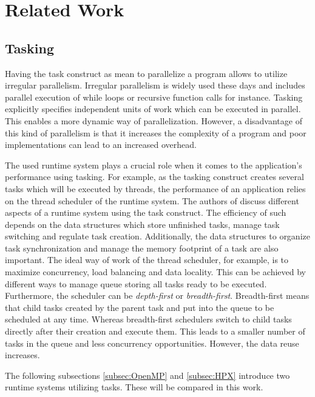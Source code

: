 \section{Related Work}

\subsection{Tasking}
  Having the task construct as mean to parallelize a program allows to utilize irregular parallelism.
  Irregular parallelism is widely used these days and includes parallel execution of while loops or recursive function calls for instance.
  Tasking explicitly specifies independent units of work which can be executed in parallel.
  This enables a more dynamic way of parallelization.
  However, a disadvantage of this kind of parallelism is that it increases the complexity of a program and poor implementations can lead to an increased overhead.~\cite{Ayguade.2009}~\cite{LaGrone.2011}
  
  
  The used runtime system plays a crucial role when it comes to the application's performance using tasking. 
  For example, as the tasking construct creates several tasks which will be executed by threads, the performance of an application relies on the thread scheduler of the runtime system.
  The authors of \cite{LaGrone.2011} discuss different aspects of a runtime system using the task construct.
  The efficiency of such depends on the data structures which store unfinished tasks, manage task switching and regulate task creation.
  Additionally, the data structures to organize task synchronization and manage the memory footprint of a task are also important.
  The ideal way of work of the thread scheduler, for example, is to maximize concurrency, load balancing and data locality.
  This can be achieved by different ways to manage queue storing all tasks ready to be executed.
  Furthermore, the scheduler can be \textit{depth-first} or \textit{breadth-first}.
  Breadth-first means that child tasks created by the parent task and put into the queue to be scheduled at any time.
  Whereas breadth-first schedulers switch to child tasks directly after their creation and execute them.
  This leads to a smaller number of tasks in the queue and less concurrency opportunities.
  However, the data reuse increases.
 
 	
  The following subsections \ref{subsec:OpenMP} and \ref{subsec:HPX} introduce two runtime systems utilizing tasks.
  These will be compared in this work.


